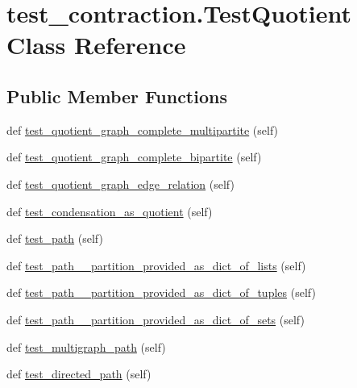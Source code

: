 \hypertarget{classtest__contraction_1_1TestQuotient}{}\section{test\+\_\+contraction.\+Test\+Quotient Class Reference}
\label{classtest__contraction_1_1TestQuotient}
\subsection*{Public Member Functions}
\begin{DoxyCompactItemize}
\item 
def \hyperlink{classtest__contraction_1_1TestQuotient_a6cd2d986cac98ce8d9e6b7138126a30d}{test\+\_\+quotient\+\_\+graph\+\_\+complete\+\_\+multipartite} (self)
\item 
def \hyperlink{classtest__contraction_1_1TestQuotient_a151fe8788bff512e9fac25646f93c31c}{test\+\_\+quotient\+\_\+graph\+\_\+complete\+\_\+bipartite} (self)
\item 
def \hyperlink{classtest__contraction_1_1TestQuotient_a5d10e9d5f7b711bbdc7455e0605d5a71}{test\+\_\+quotient\+\_\+graph\+\_\+edge\+\_\+relation} (self)
\item 
def \hyperlink{classtest__contraction_1_1TestQuotient_acb344ad8320015c12a1db1bab4b2ee9a}{test\+\_\+condensation\+\_\+as\+\_\+quotient} (self)
\item 
def \hyperlink{classtest__contraction_1_1TestQuotient_a22d7927a11b3394f1fe8d4bcae63b036}{test\+\_\+path} (self)
\item 
def \hyperlink{classtest__contraction_1_1TestQuotient_a25ac653615023eb36cde2f77b409f3b1}{test\+\_\+path\+\_\+\+\_\+partition\+\_\+provided\+\_\+as\+\_\+dict\+\_\+of\+\_\+lists} (self)
\item 
def \hyperlink{classtest__contraction_1_1TestQuotient_adc0a2309a3c4ad705f3199496d5b0852}{test\+\_\+path\+\_\+\+\_\+partition\+\_\+provided\+\_\+as\+\_\+dict\+\_\+of\+\_\+tuples} (self)
\item 
def \hyperlink{classtest__contraction_1_1TestQuotient_a6538e68aa831170d655877b36b4d2c83}{test\+\_\+path\+\_\+\+\_\+partition\+\_\+provided\+\_\+as\+\_\+dict\+\_\+of\+\_\+sets} (self)
\item 
def \hyperlink{classtest__contraction_1_1TestQuotient_aaba635f8133e7194a9bd4a8ef40639a2}{test\+\_\+multigraph\+\_\+path} (self)
\item 
def \hyperlink{classtest__contraction_1_1TestQuotient_af18d63bd10b8600406f044b4f1a12fbb}{test\+\_\+directed\+\_\+path} (self)

\end{DoxyCompactItemize}
